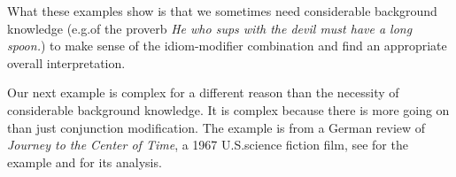 \documentclass[output=paper]{langsci/langscibook}
\begin{document}
\begin{sloppypar}
What these examples show is that we sometimes need considerable background knowledge (e.g.\@ of the proverb \textit{He who sups with the devil must have a long spoon.}) to make sense of the idiom-modifier combination and find an appropriate overall interpretation.
\end{sloppypar}

Our next example is complex for a different reason than the necessity of considerable background knowledge. It is complex because there is more going on than just conjunction modification. The example is from a German review of \textit{Journey to the Center of Time}, a 1967 U.S.\@ science fiction film, see  for the example and  for its analysis.\largerpage[-4]
\end{document}
